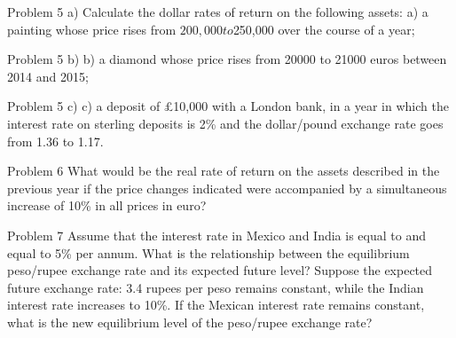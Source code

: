 \documentclass[12pt,aspectratio=169]{beamer}
\newif\ifshowsolution
\begin{document}
\fi


\begin{frame}{Problem 5 a)}
Calculate the dollar rates of return on the following assets: \newline
a) a painting whose price rises from $200,000 to $250,000 over the course of a year;
\end{frame}

\ifshowsolution
	\begin{frame}{Problem 5 a) - solution}
\[\frac{250000-200000}{200000}=0.25\] The yield is 25\%. 
\end{frame}

\fi

\begin{frame}{Problem 5 b)}
b) a diamond whose price rises from 20000 to 21000 euros between 2014 and 2015;
\end{frame}

\ifshowsolution
	\begin{frame}{Problem 5 b) - solution}
	\[\frac{21000-20000}{20000}=0.05\] The yield is 5\%. 
\end{frame}

\fi

\begin{frame}{Problem 5 c)}
c) a deposit of £10,000 with a London bank, in a year in which the interest rate on sterling deposits is 2\% and the dollar/pound exchange rate goes from 1.36 to 1.17.
\end{frame}

\ifshowsolution
	\begin{frame}{Problem 5 c) - solution}
	\[0.02+\frac{1.17-1.36}{1.36}=0.02-0.14=-0.12\] The yield is -12\%. 
\end{frame}

\fi

\begin{frame}{Problem 6}
What would be the real rate of return on the assets described in the previous year if the price changes indicated were accompanied by a simultaneous increase of 10\% in all prices in euro?
\end{frame}

\ifshowsolution
\begin{frame}{Problem 6 - solution}
The returns calculated before 10\% must be reduced. For example, the deposit in pounds sterling will have a negative return of 22\%.
\end{frame}

\fi

\begin{frame}{Problem 7}
Assume that the interest rate in Mexico and India is equal to and equal to 5\% per annum. What is the relationship between the equilibrium peso/rupee exchange rate and its expected future level? Suppose the expected future exchange rate: 3.4 rupees per peso remains constant, while the Indian interest rate increases to 10\%. If the Mexican interest rate remains constant, what is the new equilibrium level of the peso/rupee exchange rate?
\end{frame}
\end{document}
